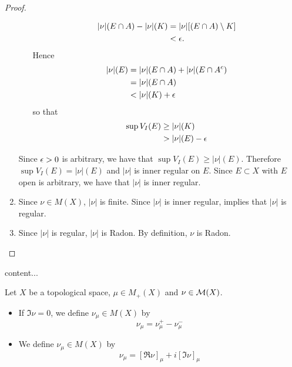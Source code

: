 \documentclass{book}
\begin{document}
\begin{proof}
\begin{enumerate}
\begin{itemize}
				\begin{align*}
					|\nu|(E \cap A) - |\nu|(K) 
					& = |\nu|[(E \cap A) \setminus K] \\
					& < \epsilon.
				\end{align*}
				Hence
				\begin{align*}
					|\nu|(E)
					& = |\nu|(E \cap A) + |\nu|(E \cap A^c) \\
					& = |\nu|(E \cap A) \\
					& < |\nu|(K) + \epsilon 
				\end{align*}
				so that 
				\begin{align*}
					\sup V_I(E)
					& \geq |\nu|(K) \\
					& > |\nu|(E) - \epsilon
				\end{align*}
			\end{itemize}
			Since $\epsilon > 0$ is arbitrary, we have that $\sup V_I(E) \geq |\nu|(E)$. Therefore $\sup V_I(E) = |\nu|(E)$ and $|\nu|$ is inner regular on $E$. Since $E \subset X$ with $E$ open is arbitrary, we have that $|\nu|$ is inner regular.
			\item Since $\nu \in M(X)$, $|\nu|$ is finite. Since $|\nu|$ is inner regular,  implies that $|\nu|$ is regular. 
			\item Since $|\nu|$ is regular, $|\nu|$ is Radon. By definition, $\nu$ is Radon.
		\end{enumerate}  
	\end{proof}

	
	\begin{ex}
		content...
	\end{ex}

	\begin{defn}
		Let $X$ be a topological space, $\mu \in M_+(X)$ and $\nu \in \mathcal{M}(X)$. 
		\begin{itemize}
			\item If $\Im \nu = 0$, we define $\nu_{\mu} \in M(X)$ by 
			$$\nu_{\mu} = \nu^+_{\mu} - \nu^-_{\mu}$$
			\item We define $\nu_{\mu} \in M(X)$ by 
			$$\nu_{\mu} = [\Re \nu]_{\mu} + i [\Im \nu]_{\mu}$$
		\end{itemize}
	\end{defn}
\end{document}
